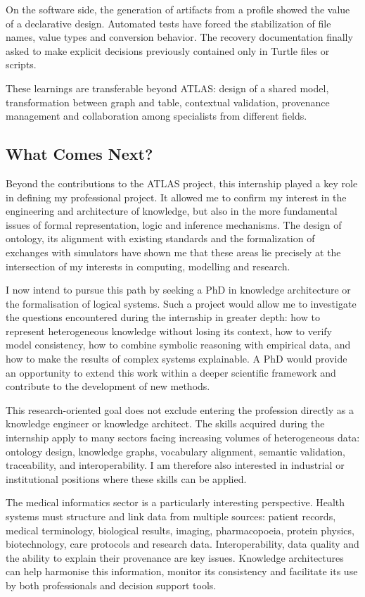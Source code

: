 \documentclass{article}
\begin{document}
On the software side, the generation of artifacts from a profile showed the value of a declarative design. Automated tests have forced the stabilization of file names, value types and conversion behavior. The recovery documentation finally asked to make explicit decisions previously contained only in Turtle files or scripts.

These learnings are transferable beyond ATLAS: design of a shared model, transformation between graph and table, contextual validation, provenance management and collaboration among specialists from different fields.

\subsection{What Comes Next?}

Beyond the contributions to the ATLAS project, this internship played a key role in defining my professional project. It allowed me to confirm my interest in the engineering and architecture of knowledge, but also in the more fundamental issues of formal representation, logic and inference mechanisms. The design of ontology, its alignment with existing standards and the formalization of exchanges with simulators have shown me that these areas lie precisely at the intersection of my interests in computing, modelling and research.

I now intend to pursue this path by seeking a PhD in knowledge architecture or the formalisation of logical systems. Such a project would allow me to investigate the questions encountered during the internship in greater depth: how to represent heterogeneous knowledge without losing its context, how to verify model consistency, how to combine symbolic reasoning with empirical data, and how to make the results of complex systems explainable. A PhD would provide an opportunity to extend this work within a deeper scientific framework and contribute to the development of new methods.

This research-oriented goal does not exclude entering the profession directly as a knowledge engineer or knowledge architect. The skills acquired during the internship apply to many sectors facing increasing volumes of heterogeneous data: ontology design, knowledge graphs, vocabulary alignment, semantic validation, traceability, and interoperability. I am therefore also interested in industrial or institutional positions where these skills can be applied.

The medical informatics sector is a particularly interesting perspective. Health systems must structure and link data from multiple sources: patient records, medical terminology, biological results, imaging, pharmacopoeia, protein physics, biotechnology, care protocols and research data. Interoperability, data quality and the ability to explain their provenance are key issues. Knowledge architectures can help harmonise this information, monitor its consistency and facilitate its use by both professionals and decision support tools.
\end{document}
